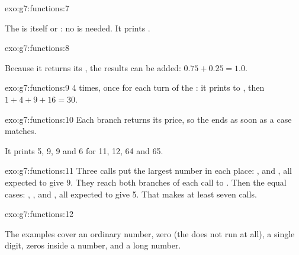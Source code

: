 \begin{solution}{exo:g7:functions:7}
\label{lst:g7:functions:sol-is-even}

The  is itself  or : no  is needed. It
prints .
\end{solution}

\begin{solution}{exo:g7:functions:8}
\label{lst:g7:functions:sol-minutes}

Because it returns its , the results can be added: $0.75 + 0.25 = 1.0$.
\end{solution}

\begin{solution}{exo:g7:functions:9}
4 times, once for each turn of the : it prints  to
, then $1 + 4 + 9 + 16 = 30$.
\end{solution}

\begin{solution}{exo:g7:functions:10}
Each branch returns its price, so the  ends as soon as a case matches.

\label{lst:g7:functions:sol-price}

It prints 5, 9, 9 and 6 for 11, 12, 64 and 65.
\end{solution}

\begin{solution}{exo:g7:functions:11}
Three calls put the largest number in each place: ,
 and , all expected to give 9.
They reach both branches of each call to . Then the equal cases:
, , 
and , all expected to give 5. That makes at least
seven calls.
\end{solution}

\begin{solution}{exo:g7:functions:12}
\label{lst:g7:functions:sol-digit-sum}

The examples cover an ordinary number, zero (the  does not run at all), a
single digit, zeros inside a number, and a long number.
\end{solution}

